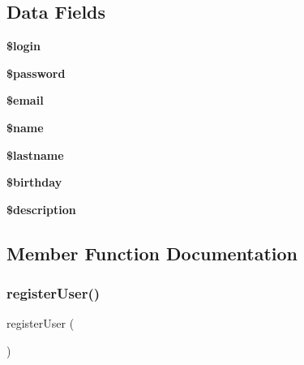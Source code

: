 \subsection*{Data Fields}
\begin{DoxyCompactItemize}
\item 
\hypertarget{classapp_1_1models_1_1_registration_afc31993e855f9631572adfedcfe6f34b}{}\label{classapp_1_1models_1_1_registration_afc31993e855f9631572adfedcfe6f34b} 
{\bfseries \$login}
\item 
\hypertarget{classapp_1_1models_1_1_registration_a607686ef9f99ea7c42f4f3dd3dbb2b0d}{}\label{classapp_1_1models_1_1_registration_a607686ef9f99ea7c42f4f3dd3dbb2b0d} 
{\bfseries \$password}
\item 
\hypertarget{classapp_1_1models_1_1_registration_ad634f418b20382e2802f80532d76d3cd}{}\label{classapp_1_1models_1_1_registration_ad634f418b20382e2802f80532d76d3cd} 
{\bfseries \$email}
\item 
\hypertarget{classapp_1_1models_1_1_registration_ab2fc40d43824ea3e1ce5d86dee0d763b}{}\label{classapp_1_1models_1_1_registration_ab2fc40d43824ea3e1ce5d86dee0d763b} 
{\bfseries \$name}
\item 
\hypertarget{classapp_1_1models_1_1_registration_a1d2ddb6354180329b59e8b90ed94dc7f}{}\label{classapp_1_1models_1_1_registration_a1d2ddb6354180329b59e8b90ed94dc7f} 
{\bfseries \$lastname}
\item 
\hypertarget{classapp_1_1models_1_1_registration_a41cf1f5996c1bf764eca3ccffea485e4}{}\label{classapp_1_1models_1_1_registration_a41cf1f5996c1bf764eca3ccffea485e4} 
{\bfseries \$birthday}
\item 
\hypertarget{classapp_1_1models_1_1_registration_a87b032cba06009e3467abf1c8018d960}{}\label{classapp_1_1models_1_1_registration_a87b032cba06009e3467abf1c8018d960} 
{\bfseries \$description}
\end{DoxyCompactItemize}


\subsection{Member Function Documentation}
\hypertarget{classapp_1_1models_1_1_registration_a1fdb0f05b888f4aa92b319775e488e70}{}\label{classapp_1_1models_1_1_registration_a1fdb0f05b888f4aa92b319775e488e70} 
\subsubsection{\texorpdfstring{register\+User()}{registerUser()}}
{\footnotesize\ttfamily register\+User (\begin{DoxyParamCaption}{ }\end{DoxyParamCaption})}

